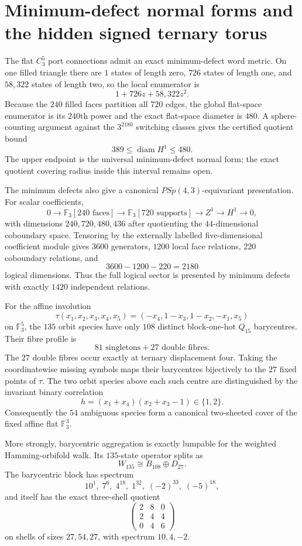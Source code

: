 \section{Minimum-defect normal forms and the hidden signed ternary torus}
\label{sec:bt3376-bt3389-cohomology-tau}
The flat $C_3^5$ port connections admit an exact minimum-defect word metric.  On one filled triangle there are $1$ states of length zero, $726$ states of length one, and $58{,}322$ states of length two, so the local enumerator is
\[
  1+726z+58{,}322z^2.
\]
Because the $240$ filled faces partition all $720$ edges, the global flat-space enumerator is its $240$th power and the exact flat-space diameter is $480$.  A sphere-counting argument against the $3^{2180}$ switching classes gives the certified quotient bound
\[
  \boxed{389\leq \operatorname{diam} H^1\leq480}.
\]
The upper endpoint is the universal minimum-defect normal form; the exact quotient covering radius inside this interval remains open.

The minimum defects also give a canonical $PSp(4,3)$-equivariant presentation.  For scalar coefficients,
\[
  0\longrightarrow \mathbb F_3[240\text{ faces}]
  \longrightarrow \mathbb F_3[720\text{ supports}]
  \longrightarrow Z^1\longrightarrow H^1\longrightarrow0,
\]
with dimensions $240,720,480,436$ after quotienting the $44$-dimensional coboundary space.  Tensoring by the externally labelled five-dimensional coefficient module gives $3600$ generators, $1200$ local face relations, $220$ coboundary relations, and
\[
  3600-1200-220=\boxed{2180}
\]
logical dimensions.  Thus the full logical sector is presented by minimum defects with exactly $1420$ independent relations.

For the affine involution
\[
 \tau(x_1,x_2,x_3,x_4,x_5)=(-x_4,1-x_3,1-x_2,-x_1,x_5)
\]
on $\mathbb F_3^5$, the $135$ orbit species have only $108$ distinct block-one-hot $Q_{15}$ barycentres.  Their fibre profile is
\[
  81\text{ singletons}+27\text{ double fibres}.
\]
The $27$ double fibres occur exactly at ternary displacement four.  Taking the coordinatewise missing symbols maps their barycentres bijectively to the $27$ fixed points of $\tau$.  The two orbit species above each such centre are distinguished by the invariant binary correlation
\[
 h=(x_1+x_4)(x_2+x_3-1)\in\{1,2\}.
\]
Consequently the $54$ ambiguous species form a canonical two-sheeted cover of the fixed affine flat $\mathbb F_3^3$.

More strongly, barycentric aggregation is exactly lumpable for the weighted Hamming-orbifold walk.  Its $135$-state operator splits as
\[
  \boxed{W_{135}\cong B_{108}\oplus D_{27}}.
\]
The barycentric block has spectrum
\[
10^1,\;7^6,\;4^{18},\;1^{32},\;(-2)^{33},\;(-5)^{18},
\]
and itself has the exact three-shell quotient
\[
 \begin{pmatrix}2&8&0\\2&4&4\\0&4&6\end{pmatrix}
\]
on shells of sizes $27,54,27$, with spectrum $10,4,-2$.

